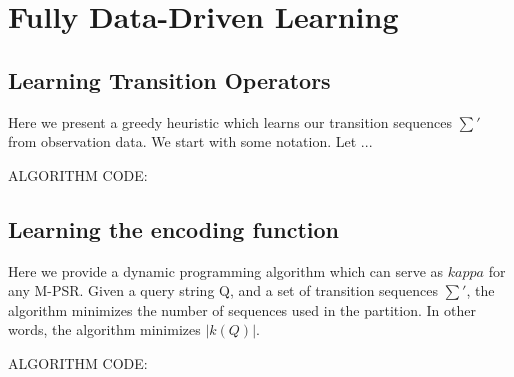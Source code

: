 \section{Fully Data-Driven Learning}

\subsection{Learning Transition Operators}

Here we present a greedy heuristic which learns our transition sequences $\sum'$ from observation data. We start with some notation. Let ... 

ALGORITHM CODE:

\subsection{Learning the encoding function}

Here we provide a dynamic programming algorithm which can serve as $kappa$ for any M-PSR. Given a query string Q, and a set of transition sequences $\sum'$, the algorithm minimizes the number of sequences used in the partition. In other words, the algorithm minimizes $|k(Q)|$.

ALGORITHM CODE:

